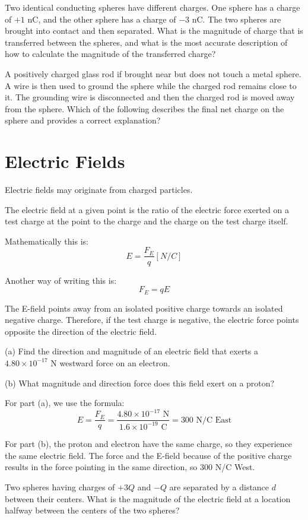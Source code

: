 \documentclass[../em.tex]{subfiles}
\begin{document}
\ex Two identical conducting spheres have different charges. One sphere has a charge of $+1$ nC, and the other sphere has a charge of $-3$ nC. The two spheres are brought into contact and then separated. What is the magnitude of charge that is transferred between the spheres, and what is the most accurate description of how to calculate the magnitude of the transferred charge?

\ex A positively charged glass rod if brought near but does not touch a metal sphere. A wire is then used to ground the sphere while the charged rod remains close to it. The grounding wire is disconnected and then the charged rod is moved away from the sphere. Which of the following describes the final net charge on the sphere and provides a correct explanation?

\section{Electric Fields}
Electric fields may originate from charged particles.

The electric field at a given point is the ratio of the electric force exerted on a test 
charge at the point to the charge and the charge on the test charge itself.

Mathematically this is:
\[E = \frac{F_E}{q}[N/C]\]

Another way of writing this is:
\[F_E=qE\]

The E-field points away from an isolated positive charge towards an 
isolated negative charge. Therefore, if the test charge is negative, 
the electric force points opposite the direction of the electric field.

\begin{example}
(a) Find the direction and magnitude of an electric field that exerts a $4.80\times10^{-17}$ N westward force on an electron. 

(b) What magnitude and direction force does this field exert on a proton?

For part (a), we use the formula:
\[E=\frac{F_E}{q}=\frac{4.80\times10^{-17}\text{ N}}{1.6\times10^{-19}\text{ C}}=300  \text{ N/C East}\]

For part (b), the proton and electron have the same charge, so they experience the same electric field. 
The force and the E-field because of the positive charge results in the force pointing in the same direction, so 300 N/C West.
\end{example}

\ex Two spheres having charges of $+3Q$ and $-Q$ are separated by a distance $d$ between their centers. What is the magnitude of the electric field at a location halfway between the centers of the two spheres?
\end{document}
